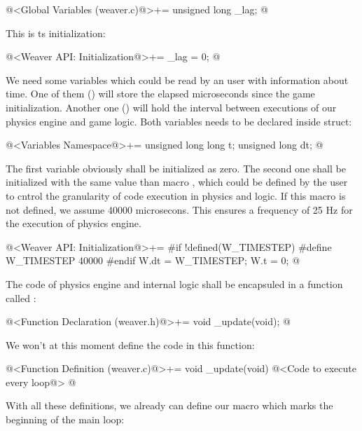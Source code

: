 \iniciocodigo
@<Global Variables (weaver.c)@>+=
unsigned long _lag;
@
\fimcodigo


This is ts initialization:

\iniciocodigo
@<Weaver API: Initialization@>+=
_lag = 0;
@
\fimcodigo

We need some variables which could be read by an user with information
about time. One of them () will store the elapsed
microseconds since the game initialization. Another one
() will hold the interval between executions of our
physics engine and game logic. Both variables needs to be declared
inside  struct:

\iniciocodigo
@<Variables Namespace@>+=
unsigned long long t;
unsigned long dt;
@
\fimcodigo

The first variable obviously shall be initialized as zero.  The second
one shall be initialized with the same value than
macro , which could be defined by the user to
cntrol the granularity of code execution in physics and logic. If this
macro is not defined, we assume 40000 microsecons. This ensures a
frequency of 25 Hz for the execution of physics engine.

\iniciocodigo
@<Weaver API: Initialization@>+=
#if !defined(W_TIMESTEP)
#define W_TIMESTEP 40000
#endif
W.dt = W_TIMESTEP;
W.t = 0;
@
\fimcodigo

The code of physics engine and internal logic shall be encapsuled in a
function called :

\iniciocodigo
@<Function Declaration (weaver.h)@>+=
void _update(void);
@
\fimcodigo

We won't at this moment define the code in this function:

\iniciocodigo
@<Function Definition (weaver.c)@>+=
void _update(void){
  @<Code to execute every loop@>
}
@
\fimcodigo

With all these definitions, we already can define our macro which
marks the beginning of the main loop:

